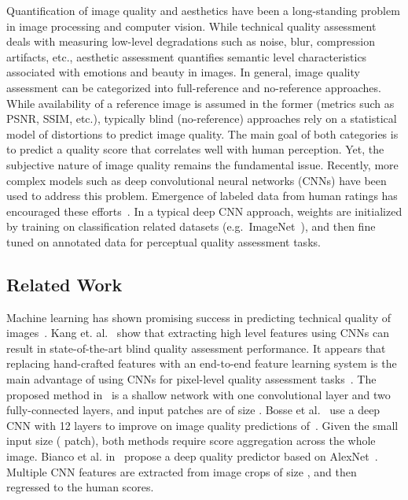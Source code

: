 \documentclass[10pt,twocolumn,twoside]{IEEEtran}
\begin{document}
Quantification of image quality and aesthetics have been a long-standing problem in image processing and computer vision. While technical quality assessment deals with measuring low-level degradations such as noise, blur, compression artifacts, etc., aesthetic assessment quantifies semantic level characteristics associated with emotions and beauty in images. In general, image quality assessment can be categorized into full-reference and no-reference approaches. While availability of a reference image is assumed in the former (metrics such as PSNR, SSIM\cite{wang2004image}, etc.), typically blind (no-reference) approaches rely on a statistical model of distortions to predict image quality. The main goal of both categories is to predict a quality score that correlates well with human perception. Yet, the subjective nature of image quality remains the fundamental issue. Recently, more complex models such as deep convolutional neural networks (CNNs) have been used to address this problem\cite{xue2013learning, kang2014convolutional, bosse2016deep, bianco2016use, lu2015deep, kao2015visual, mai2016composition, jin2016image}. Emergence of labeled data from human ratings has encouraged these efforts~\cite{murray2012ava,ponomarenko2013color,sheikh2005live,larson2010most,kong2016photo}. In a typical deep CNN approach, weights are initialized by training on classification related datasets (e.g.\ ImageNet~\cite{krizhevsky2012imagenet}), and then fine tuned on annotated data for perceptual quality assessment tasks.

 \subsection{Related Work}
Machine learning has shown promising success in predicting technical quality of images~\cite{xue2013learning, kang2014convolutional, bosse2016deep, bianco2016use}. Kang et. al.~\cite{kang2014convolutional} show that extracting high level features using CNNs can result in state-of-the-art blind quality assessment performance. It appears that replacing hand-crafted features with an end-to-end feature learning system is the main advantage of using CNNs for pixel-level quality assessment tasks~\cite{kang2014convolutional, bosse2016deep}. The proposed method in~\cite{kang2014convolutional} is a shallow network with one convolutional layer and two fully-connected layers, and input patches are of size . Bosse et al.~\cite{bosse2016deep} use a deep CNN with 12 layers to improve on image quality predictions of~\cite{kang2014convolutional}. Given the small input size ( patch), both methods require score aggregation across the whole image. Bianco et al. in~\cite{bianco2016use} propose a deep quality predictor based on AlexNet~\cite{krizhevsky2012imagenet}. Multiple CNN features are extracted from image crops of size , and then regressed to the human scores.
\end{document}
